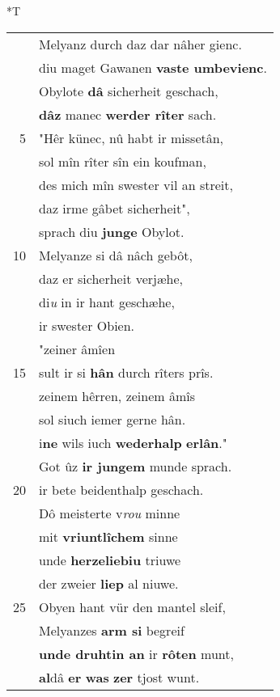 \documentclass[8pt,a4paper,notitlepage]{article}
\begin{document}
\begin{table}[ht]
\begin{minipage}[t]{0.5\linewidth}
\end{minipage}
\hspace{0.5cm}
\begin{minipage}[t]{0.5\linewidth}
\small
\begin{center}*T
\end{center}
\begin{tabular}{rl}
 & Melyanz durch daz dar nâher gienc.\\ 
 & diu maget Gawanen \textbf{vaste umbevienc}.\\ 
 & Obylote \textbf{dâ} sicherheit geschach,\\ 
 & \textbf{dâz} manec \textbf{werder rîter} sach.\\ 
5 & "Hêr künec, nû habt ir missetân,\\ 
 & sol mîn rîter sîn ein koufman,\\ 
 & des mich mîn swester vil an streit,\\ 
 & daz irme gâbet sicherheit",\\ 
 & sprach diu \textbf{junge} Obylot.\\ 
10 & Melyanze si dâ nâch gebôt,\\ 
 & daz er sicherheit verjæhe,\\ 
 & di\textit{u} in ir hant geschæhe,\\ 
 & ir swester Obien.\\ 
 & "zeiner âmîen\\ 
15 & sult ir si \textbf{hân} durch rîters prîs.\\ 
 & zeinem hêrren, zeinem âmîs\\ 
 & sol siuch iemer gerne hân.\\ 
 & i\textbf{ne} wils iuch \textbf{wederhalp} \textbf{erlân}."\\ 
 & Got ûz \textbf{ir jungem} munde sprach.\\ 
20 & ir bete beidenthalp geschach.\\ 
 & Dô meisterte v\textit{rou} minne\\ 
 & mit \textbf{vriuntlîchem} sinne\\ 
 & unde \textbf{herzeliebiu} triuwe\\ 
 & der zweier \textbf{liep} al niuwe.\\ 
25 & Obyen hant vür den mantel sleif,\\ 
 & Melyanzes \textbf{arm si} begreif\\ 
 & \textbf{unde druhtin an} ir \textbf{rôten} munt,\\ 
 & \textbf{al}dâ \textbf{er} \textbf{was} \textbf{ze}\textbf{r} tjost wunt.\\ 

\end{tabular}
\end{minipage}
\end{table}
\end{document}
